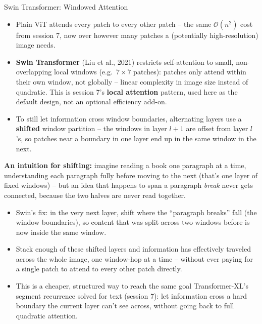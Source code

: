 \begin{vbframe}{Swin Transformer: Windowed Attention}
\begin{itemize}
  \item Plain ViT attends every patch to every other patch -- the same $\mathcal{O}(n^2)$ cost from session 7, now over however many patches a (potentially high-resolution) image needs.
  \item \textbf{Swin Transformer} (Liu et al., 2021) restricts self-attention to small, non-overlapping local windows (e.g.\ $7\times7$ patches): patches only attend within their own window, not globally -- linear complexity in image size instead of quadratic. This is session 7's \textbf{local attention} pattern, used here as the default design, not an optional efficiency add-on.
  \item To still let information cross window boundaries, alternating layers use a \textbf{shifted} window partition -- the windows in layer $l+1$ are offset from layer $l$'s, so patches near a boundary in one layer end up in the same window in the next.
\end{itemize}

\framebreak

\textbf{An intuition for shifting:} imagine reading a book one paragraph at a time, understanding each paragraph fully before moving to the next (that's one layer of fixed windows) -- but an idea that happens to span a paragraph \emph{break} never gets connected, because the two halves are never read together.
\begin{itemize}
  \item Swin's fix: in the very next layer, shift where the ``paragraph breaks'' fall (the window boundaries), so content that was split across two windows before is now inside the same window.
  \item Stack enough of these shifted layers and information has effectively traveled across the whole image, one window-hop at a time -- without ever paying for a single patch to attend to every other patch directly.
  \item This is a cheaper, structured way to reach the same goal Transformer-XL's segment recurrence solved for text (session 7): let information cross a hard boundary the current layer can't see across, without going back to full quadratic attention.
\end{itemize}

\framebreak


\end{vbframe}
